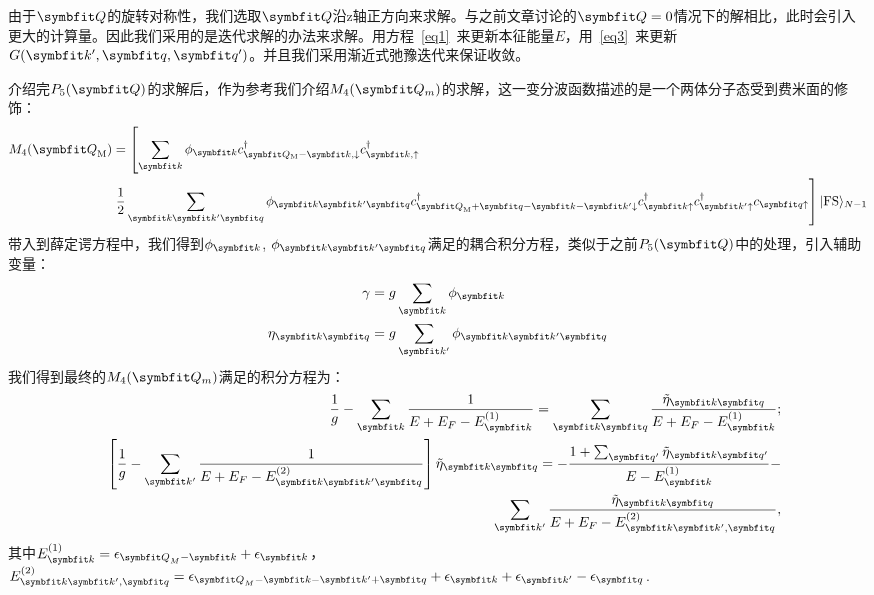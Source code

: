 由于$\Vector{Q}$的旋转对称性，我们选取$\Vector{Q}$沿z轴正方向来求解。与之前文章讨论的$\Vector{Q}=0$情况下的解相比，此时会引入更大的计算量。因此我们采用的是迭代求解的办法来求解。用方程~\ref{eq1}~来更新本征能量$E$，用~\ref{eq3}~来更新${G}(\Vector{k}',\Vector{q},\Vector{q}')$。并且我们采用渐近式弛豫迭代来保证收敛。

介绍完$P_5(\Vector{Q})$的求解后，作为参考我们介绍$M_4(\Vector{Q}_m)$的求解，这一变分波函数描述的是一个两体分子态受到费米面的修饰：
\begin{equation}
\begin{split}
M_{4}({\Vector{Q}}_{\rm M})&=\left[\sum_{{\Vector{k} }}\phi_{{\Vector{k} }} c^{\dag}_{{\Vector{Q}_{\rm M}}-{\Vector{k}},\downarrow}c^{\dag}_{\Vector{k},\uparrow} \right.  \\
&\left.  \frac{1}{2} \sum_{{\Vector{k} }{\Vector{k'} } {\Vector{q} }}\phi_{{\Vector{k} }{\Vector{k'} }  {\Vector{q} } } c^{\dag}_{{\Vector{Q} }_{\rm M}+{\Vector{q} }-{\Vector{k} }-{\Vector{k'} } \downarrow} c^{\dag}_{{\Vector{k} }\uparrow}c^{\dag}_{{\Vector{k'} }\uparrow}c_{{\Vector{q} } \uparrow}\right] |{\rm FS}\rangle_{N-1}\\ \label{wf_m}
\end{split}
\end{equation}
带入到薛定谔方程中，我们得到$\phi_{{\Vector{k} }}$, $\phi_{{\Vector{k} }{\Vector{k'} }  {\Vector{q} } }$满足的耦合积分方程，类似于之前$P_5(\Vector{Q})$中的处理，引入辅助变量：
\begin{equation}
\begin{split}
\gamma&=g\sum_{\Vector{k} } \phi_{\Vector{k} }\\
\eta_{{\Vector{k} }{\Vector{q} }}&=g\sum_{\Vector{k'} }\phi_{{\Vector{k} }{\Vector{k'} }{\Vector{q} }}\\
\end{split}
\end{equation}
我们得到最终的$M_4(\Vector{Q}_m)$满足的积分方程为：
\begin{eqnarray}
&&\frac{1}{g}-\sum_{\Vector{k} }\frac{1}{E+E_F-E^{(1)}_{{\Vector{k} }}}=\sum_{{\Vector{k} }{\Vector{q} }}  \frac{ \tilde{\eta}_{\Vector{k}\Vector{q}} }{ E+E_F-E^{(1)}_{\Vector{k}}} ;\\
&&\left[\frac{1}{g}-\sum_{\Vector{k'} }\frac{1}{E+E_F-E^{(2)}_{{\Vector{k} }{\Vector{k'} }{\Vector{q} }}}\right]\tilde{\eta}_{\Vector{k}\Vector{q}} = -\frac{1+\sum_{\Vector{q'} }\tilde{\eta}_{\Vector{k}\Vector{q'}} }{E-E^{(1)}_{\Vector{k} }}- \nonumber\\
&& \ \ \ \ \ \ \ \ \ \ \ \ \ \ \ \ \ \ \ \ \ \ \ \ \ \ \ \ \ \sum_{\Vector{k}'} \frac{ \tilde{\eta}_{\Vector{k}\Vector{q}} }{ E+E_F-E^{(2)}_{\Vector{k}\Vector{k}',\Vector{q}}},
\end{eqnarray}
其中$E^{(1)}_{\Vector{k} }=\epsilon_{{\Vector{Q} }_M-{\Vector{k} }}+\epsilon_{{\Vector{k} }}$，$E^{(2)}_{\Vector{k}\Vector{k}',\Vector{q}}=\epsilon_{{\Vector{Q} }_M-{\Vector{k} }-{\Vector{k'} }+{\Vector{q} }}+\epsilon_{{\Vector{k} }}+\epsilon_{{\Vector{k} }'}-\epsilon_{{\Vector{q} }}$.


